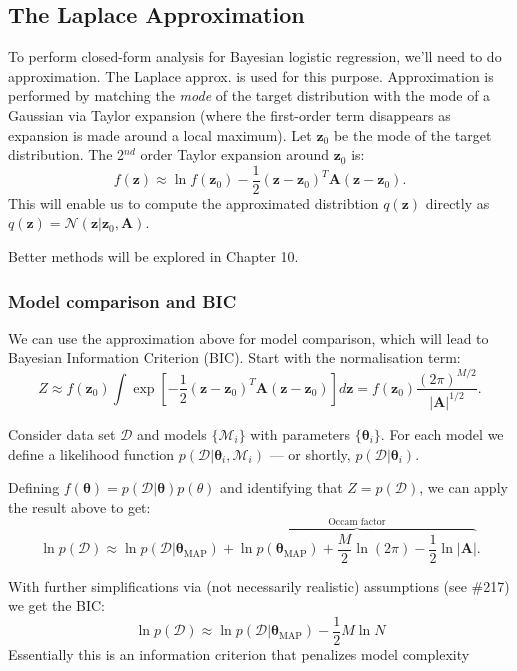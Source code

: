 \documentclass[a4paper]{article}
\newcommand{\mb}{\mathbf}
\newcommand{\bs}{\boldsymbol}
\newcommand{\bnote}[1]{#1\reversemarginpar\marginpar{{\textit{{\textcolor{blue}{#1}}}}}}
\begin{document}
\subsection{The Laplace Approximation}
To perform closed-form analysis for Bayesian logistic regression, we'll need to do approximation. The Laplace approx. is used for this purpose. Approximation is performed by matching the \textit{mode} of the target distribution with the mode of a Gaussian via Taylor expansion (where the first-order term disappears as expansion is made around a local maximum). Let $\mathbf{z}_0$ be the mode of the target distribution. The 2$^{nd}$ order Taylor expansion around $\mb{z}_0$ is:
\begin{equation}
f(\mb{z})\approx\ln f(\mb{z}_0)-\frac{1}{2}(\mb{z-z}_0)^{T}\mb{A}(\mb{z-z}_0).
\end{equation}
%
This will enable us to compute the approximated distribtion $q(\mb{z})$ directly as $q(\mb{z})=\mathcal{N}(\mb{z}|\mb{z}_0, \mb{A})$.

\bnote{Better methods will be explored in Chapter 10}.

\subsubsection{Model comparison and BIC}
We can use the approximation above for model comparison, which will lead to Bayesian Information Criterion (BIC). Start with the normalisation term: 
\begin{equation}
Z\approx f(\mb{z}_0) \int \exp \left[ -\frac{1}{2}(\mb{z-z}_0)^T \mb{A}(\mb{z-z}_0) \right] d\mb{z}=f(\mb{z}_0)\frac{(2\pi)^{M/2}}{|\mb{A}|^{1/2}}.
\end{equation}

Consider data set $\mathcal{D}$ and models $\{\mathcal{M}_i\}$ with parameters $\{\bs{\theta}_i\}$. For each model we define a likelihood function $p(\mathcal{D}|\bs{\theta}_i, \mathcal{M}_i)$ \---- or shortly, $p(\mathcal{D}|\bs{\theta}_i)$.

Defining $f(\bs{\theta})=p(\mathcal{D}|\bs{\theta})p(\theta)$ and identifying that $Z=p(\mathcal{D})$, we can apply the result above to get:
%
\begin{equation}
\ln p(\mathcal{D})\approx \ln p(\mathcal{D}|\bs{\theta}_{\text{MAP}})+\overbrace{\ln p(\bs{\theta}_{\text{MAP}})+\frac{M}{2}\ln(2\pi)-\frac{1}{2}\ln |\mb{A}|}^{\text{Occam factor}}.
\end{equation}

With further simplifications via (not necessarily realistic) assumptions (see \#217) we get the BIC:
\begin{equation}
\ln p(\mathcal{D}) \approx \ln p(\mathcal{D}|\bs{\theta}_{\text{MAP}})-\frac{1}{2}M \ln N
\end{equation}
Essentially this is an information criterion that penalizes model complexity
\end{document}
